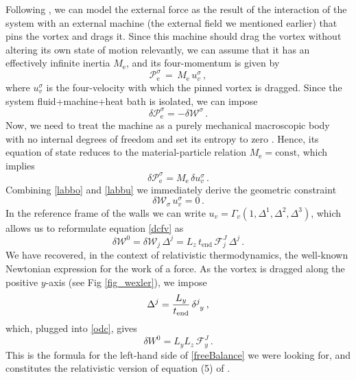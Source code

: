 \documentclass[preprints,article,accept,moreauthors,pdftex]{mdpi}
\begin{document}
Following \citet{landau5}, we can model the external force as the result of the interaction of the system with an external machine (the external field we mentioned earlier) that pins the vortex and drags it. Since this machine should drag the vortex without altering its own state of motion relevantly, we can assume that it has an effectively infinite inertia $M_{\text{e}}$, and its four-momentum is given by 
\begin{equation}
\mathcal{P}^\sigma_{\text{e}} \, = \, M_{\text{e}} \,  u_{v}^\sigma \, , 
\end{equation}
where $u_{v}^\sigma$ is the four-velocity with which the pinned vortex is dragged. 
Since the system fluid+machine+heat bath is isolated, we can impose
\begin{equation}
\label{labbo}
\delta \mathcal{P}^\sigma_{\text{e}}=-\delta \mathcal{W}^\sigma \, .
\end{equation}
Now, we need to treat the machine as a purely mechanical macroscopic body with no internal degrees of freedom and set its entropy to zero \cite{landau5}. Hence, its equation of state reduces to the material-particle relation $M_{\text{e}} = \text{const}$, which   implies
\begin{equation}\label{labbu}
\delta \mathcal{P}^\sigma_{\text{e}}= M_{\text{e}} \, \delta u_{v}^\sigma \, .
\end{equation}
Combining \eqref{labbo} and \eqref{labbu} we immediately derive the geometric constraint
\begin{equation}\label{dcfv}
\delta \mathcal{W}_\sigma \,  u_{v }^\sigma=0 \, .
\end{equation} 
In the reference frame of the walls we can write 
$u_v=\Gamma_v(1, \Delta^1, \Delta^2, \Delta^3)$, 
which allows us to reformulate equation \eqref{dcfv} as
\begin{equation}\label{odc}
\delta \mathcal{W}^0 = \delta \mathcal{W}_j \, \Delta^j 
= L_z \, t_{\text{end}} \, \mathcal{F}^{J}_j \, \Delta^j \,  .
\end{equation}
We have recovered, in the context of relativistic thermodynamics, the well-known Newtonian expression for the work of a force. As the vortex is dragged along the positive $y$-axis (see Fig \ref{fig_wexler}), we impose
\begin{equation}
\Delta^j = \dfrac{L_y}{t_{\text{end}}} \, \delta\indices{^j _y} \, ,
\end{equation} 
which, plugged into \eqref{odc}, gives
\begin{equation}\label{deltaW0}
\delta W^0 = L_y L_z \, \mathcal{F}^{J}_y \, . 
\end{equation}
This is the formula for the left-hand side of \eqref{freeBalance} we were looking for, and constitutes the relativistic version of equation (5) of \citet{Wexler1997}.
\end{document}
